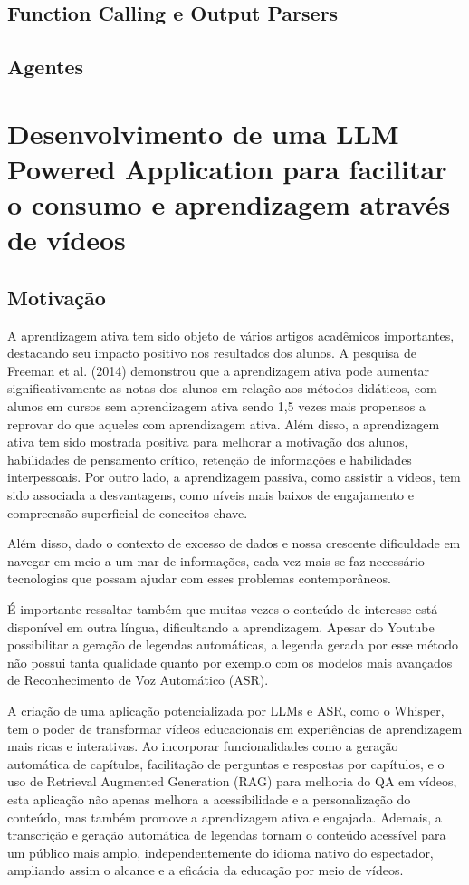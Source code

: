 \documentclass[tcc,capa]{texufpel}
\begin{document}
\section{Function Calling e Output Parsers}
\section{Agentes}
\chapter{Desenvolvimento de uma LLM Powered Application para facilitar o consumo e aprendizagem através de vídeos}

\section{Motivação}

A aprendizagem ativa tem sido objeto de vários artigos acadêmicos importantes, destacando seu impacto positivo nos resultados dos alunos. A pesquisa de Freeman et al. (2014) demonstrou que a aprendizagem ativa pode aumentar significativamente as notas dos alunos em relação aos métodos didáticos, com alunos em cursos sem aprendizagem ativa sendo 1,5 vezes mais propensos a reprovar do que aqueles com aprendizagem ativa. Além disso, a aprendizagem ativa tem sido mostrada positiva para melhorar a motivação dos alunos, habilidades de pensamento crítico, retenção de informações e habilidades interpessoais. Por outro lado, a aprendizagem passiva, como assistir a vídeos, tem sido associada a desvantagens, como níveis mais baixos de engajamento e compreensão superficial de conceitos-chave.

Além disso, dado o contexto de excesso de dados e nossa crescente dificuldade em navegar em meio a um mar de informações, cada vez mais se faz necessário tecnologias que possam ajudar com esses problemas contemporâneos.

É importante ressaltar também que muitas vezes o conteúdo de interesse está disponível em outra língua, dificultando a aprendizagem. Apesar do Youtube possibilitar a geração de legendas automáticas, a legenda gerada por esse método não possui tanta qualidade quanto por exemplo com os modelos mais avançados de Reconhecimento de Voz Automático (ASR).

A criação de uma aplicação potencializada por LLMs e ASR, como o Whisper, tem o poder de transformar vídeos educacionais em experiências de aprendizagem mais ricas e interativas. Ao incorporar funcionalidades como a geração automática de capítulos, facilitação de perguntas e respostas por capítulos, e o uso de Retrieval Augmented Generation (RAG) para melhoria do QA em vídeos, esta aplicação não apenas melhora a acessibilidade e a personalização do conteúdo, mas também promove a aprendizagem ativa e engajada. Ademais, a transcrição e geração automática de legendas tornam o conteúdo acessível para um público mais amplo, independentemente do idioma nativo do espectador, ampliando assim o alcance e a eficácia da educação por meio de vídeos.
\end{document}
